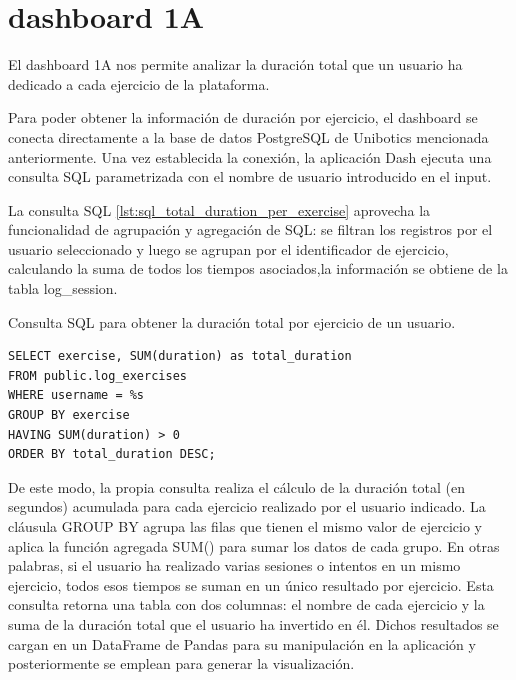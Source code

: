 \documentclass[a4paper, 12pt]{book}
\begin{document}
\section{dashboard 1A}
    \label{sec:dash1a}


El dashboard 1A nos permite analizar la duración total que un usuario ha dedicado a cada ejercicio de la plataforma.

Para poder obtener la información de duración por ejercicio, el dashboard se conecta directamente a la base de datos PostgreSQL de Unibotics mencionada anteriormente.
Una vez establecida la conexión, la aplicación Dash ejecuta una consulta SQL parametrizada con el nombre de usuario introducido en el input.

La consulta SQL \ref{lst:sql_total_duration_per_exercise} aprovecha la funcionalidad de agrupación y agregación de SQL: se filtran los registros por el usuario seleccionado y luego se agrupan por el identificador de ejercicio, calculando la suma de todos los tiempos asociados,la información se obtiene de la tabla log\_session.

\begin{listing}[h!]
    \caption{Consulta SQL para obtener la duración total por ejercicio de un usuario.}{}
    \label{lst:sql_total_duration_per_exercise}
    \begin{verbatim}
SELECT exercise, SUM(duration) as total_duration
FROM public.log_exercises
WHERE username = %s
GROUP BY exercise
HAVING SUM(duration) > 0  
ORDER BY total_duration DESC;
    \end{verbatim}
\end{listing}


De este modo, la propia consulta realiza el cálculo de la duración total (en segundos) acumulada para cada ejercicio realizado por el usuario indicado. La cláusula GROUP BY agrupa las filas que tienen el mismo valor de ejercicio y aplica la función agregada SUM() para sumar los datos de cada grupo.
En otras palabras, si el usuario ha realizado varias sesiones o intentos en un mismo ejercicio, todos esos tiempos se suman en un único resultado por ejercicio. Esta consulta retorna una tabla con dos columnas: el nombre de cada ejercicio y la suma de la duración total que el usuario ha invertido en él. Dichos resultados se cargan en un DataFrame de Pandas para su manipulación en la aplicación y posteriormente se emplean para generar la visualización.
\end{document}
